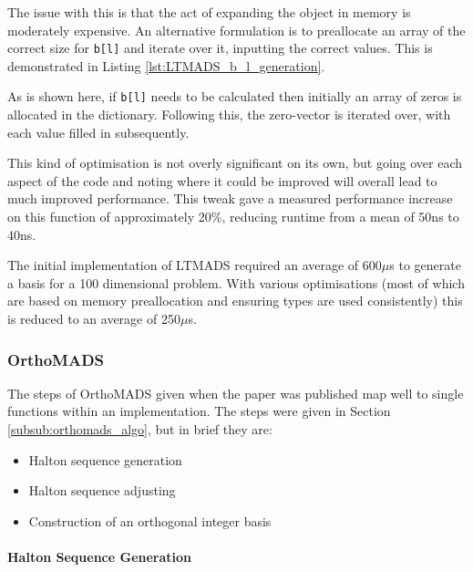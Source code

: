 The issue with this is that the act of expanding the object in memory is moderately expensive. An alternative formulation is to preallocate an array of the correct size for \texttt{b[l]} and iterate over it, inputting the correct values. This is demonstrated in Listing \ref{lst:LTMADS_b_l_generation}. 

\begin{figure}[t]
    
\end{figure}

As is shown here, if \texttt{b[l]} needs to be calculated then initially an array of zeros is allocated in the dictionary. Following this, the zero-vector is iterated over, with each value filled in subsequently. 

This kind of optimisation is not overly significant on its own, but going over each aspect of the code and noting where it could be improved will overall lead to much improved performance. This tweak gave a measured performance increase on this function of approximately 20\%, reducing runtime from a mean of 50ns to 40ns.

The initial implementation of LTMADS required an average of 600$\mu$s to generate a basis for a 100 dimensional problem. With various optimisations (most of which are based on memory preallocation and ensuring types are used consistently) this is reduced to an average of 250$\mu$s. 

\subsubsection{OrthoMADS}
The steps of OrthoMADS given when the paper was published \cite{Abramson2009Orthomads:Ions} map well to single functions within an implementation. The steps were given in Section \ref{subsub:orthomads_algo}, but in brief they are:
\begin{itemize}
    \item Halton sequence generation
    \item Halton sequence adjusting
    \item Construction of an orthogonal integer basis
\end{itemize}

\paragraph{Halton Sequence Generation}\\

